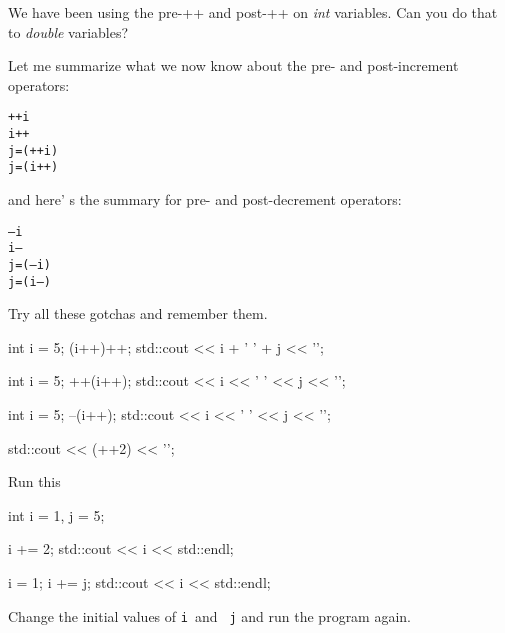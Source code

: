 \begin{ex}
 We have been using the pre-++ and post-++ on \textit{int} variables. Can you do that to \emph{double} variables?
\end{ex}
Let me summarize what we now know about the pre- and post-increment
operators:
\begin{flushleft}
\texttt{++i}\\
\texttt{i++}\\
\texttt{j=(++i)}\\
\texttt{j=(i++)}\\
\end{flushleft}
and here' s the summary for pre- and post-decrement
operators:
\begin{flushleft}
\texttt{--i}\\
\texttt{i--}\\
\texttt{j=(--i)}\\
\texttt{j=(i--)}\\
\end{flushleft}
\newpage{}

Try all these gotchas and remember them.
\begin{console}
int i = 5;
(i++)++;
std::cout << i + ' ' + j << '\n';
\end{console}
\begin{console}
int i = 5;
++(i++);
std::cout << i << ' ' << j << '\n';
\end{console}
\begin{console}
int i = 5;
--(i++);
std::cout << i << ' ' << j << '\n';
\end{console}
\begin{console}
std::cout << (++2) << '\n';
\end{console}
\newpage{}

\begin{ex}
Run this
\begin{console}
int i = 1, j = 5;

i += 2;
std::cout << i << std::endl;

i = 1;
i += j;
std::cout << i << std::endl;
\end{console}
Change the initial values of \texttt{i }and \texttt{ j} and run the program
again.
\end{ex}


